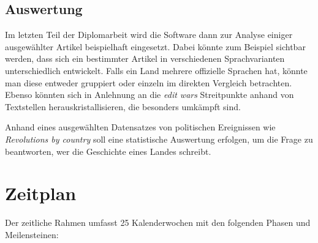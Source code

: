 \subsection{Auswertung}

Im letzten Teil der Diplomarbeit wird die Software dann zur Analyse einiger ausgewählter Artikel beispielhaft eingesetzt.
Dabei könnte zum Beispiel sichtbar werden, dass sich ein bestimmter Artikel in verschiedenen Sprachvarianten unterschiedlich entwickelt. 
Falls ein Land mehrere offizielle Sprachen hat, könnte man diese entweder gruppiert oder einzeln im direkten Vergleich betrachten.
Ebenso könnten sich in Anlehnung an die \emph{edit wars} Streitpunkte anhand von Textstellen herauskristallisieren, die besonders umkämpft sind. 

Anhand eines ausgewählten Datensatzes von politischen Ereignissen wie \emph{Revolutions by country} soll eine statistische Auswertung erfolgen, um die Frage zu beantworten, wer die Geschichte eines Landes schreibt.


\section{Zeitplan}

Der zeitliche Rahmen umfasst 25 Kalenderwochen mit den folgenden Phasen und Meilensteinen:

\vspace{5 mm}
\noindent{}
